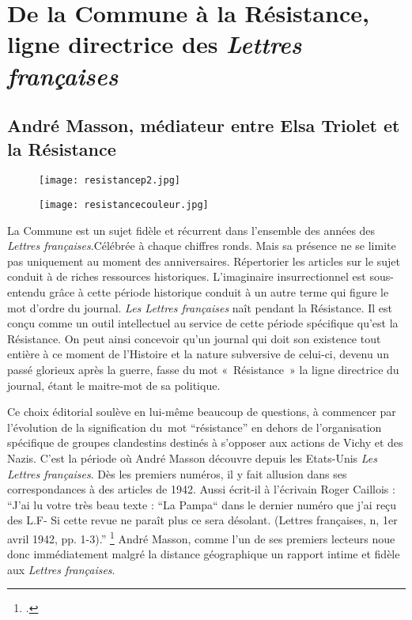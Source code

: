 \section{De la Commune à la Résistance, ligne directrice des \emph{Lettres françaises}}

\subsection{André Masson, médiateur entre Elsa Triolet et la Résistance}

\begin{figure}[H]
   \centering
   \texttt{[image: resistancep2.jpg]}
	\caption{\cite{specialelsa}}\label{fig:Réssitance}
\end{figure}

\begin{figure}[H]
   \centering
   \texttt{[image: resistancecouleur.jpg]}
	\caption{\cite{specialelsa}}\label{fig:Réssitancecouleur}
\end{figure}


La Commune est un sujet fidèle et récurrent dans l’ensemble des années des \emph{Lettres françaises}.Célébrée à chaque chiffres ronds. Mais sa présence ne se limite pas uniquement au moment des anniversaires. Répertorier les articles sur le sujet conduit à de riches ressources historiques. L’imaginaire insurrectionnel est sous-entendu grâce à cette période historique conduit à un autre terme qui figure le mot d’ordre du journal. \emph{Les Lettres françaises} naît pendant la Résistance. Il est conçu comme un outil intellectuel au service de cette période spécifique qu’est la Résistance. On peut ainsi concevoir qu’un journal qui doit son existence tout entière à ce moment de l’Histoire et la nature subversive de celui-ci, devenu un passé glorieux après la guerre, fasse du mot « Résistance » la ligne directrice du journal, étant le maitre-mot de sa politique. 


	Ce choix éditorial soulève en lui-même beaucoup de questions, à commencer par l’évolution de la signification du mot \enquote{résistance} en dehors de l’organisation spécifique de groupes clandestins destinés à s’opposer aux actions de Vichy et des Nazis. C’est la période où André Masson découvre depuis les Etats-Unis \emph{Les Lettres françaises}. Dès les premiers numéros, il y  fait allusion dans ses correspondances à des articles de 1942. Aussi écrit-il à l’écrivain Roger Caillois : \enquote{J’ai lu votre très beau texte : “La Pampa“ dans le dernier numéro que j’ai reçu des L.F- Si cette revue ne paraît plus ce sera désolant. (Lettres françaises, n, 1er avril 1942, pp. 1-3).} \footcite[p482]{anneessurrealistes} André Masson, comme l’un de ses premiers lecteurs noue donc immédiatement malgré la distance géographique un rapport intime et fidèle aux \emph{Lettres françaises}. 



